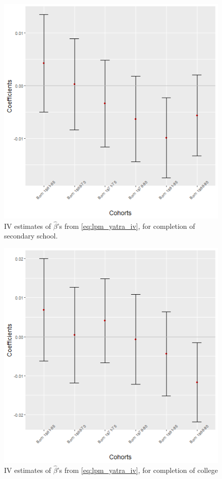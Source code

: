 \documentclass{article}
\begin{document}
\begin{figure}[H]
    \centering
    \includegraphics[scale = 0.5]{images/graph_coeff_sec_iv.png}
    \caption{IV estimates of $\hat{\beta}$'s from \eqref{eq:lpm_yatra_iv}, for completion of secondary school.}
    \label{fig:coeff_sec_iv}
\end{figure}

\begin{figure}[H]
    \centering
    \includegraphics[scale = 0.5]{images/graph_coeff_col_iv.png}
    \caption{IV estimates of $\hat{\beta}$'s from \eqref{eq:lpm_yatra_iv}, for completion of college}
    \label{fig:coeff_col_iv}
\end{figure}
\end{document}
